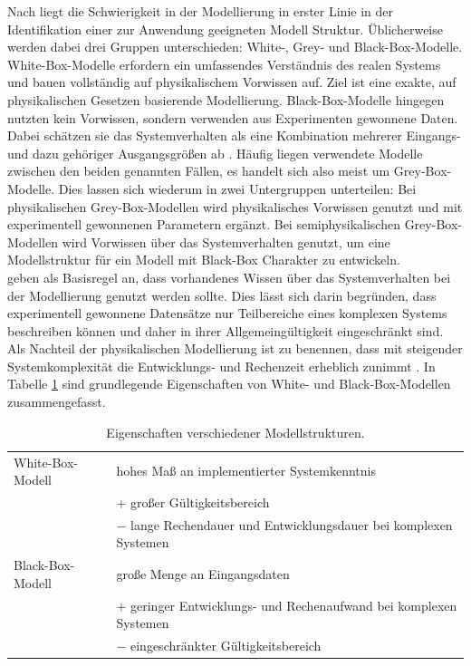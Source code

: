 Nach \citet{sjoberg_nonlinear_1995} liegt die Schwierigkeit in der Modellierung in erster Linie in der Identifikation einer zur Anwendung geeigneten Modell Struktur. Üblicherweise werden dabei drei Gruppen unterschieden: White-, Grey- und Black-Box-Modelle. White-Box-Modelle erfordern ein umfassendes Verständnis des realen Systems und bauen vollständig auf physikalischem Vorwissen auf. Ziel ist eine exakte, auf physikalischen Gesetzen basierende Modellierung. Black-Box-Modelle hingegen nutzten kein Vorwissen, sondern verwenden aus Experimenten gewonnene Daten. Dabei schätzen sie das Systemverhalten als eine Kombination mehrerer Eingangs- und dazu gehöriger Ausgangsgrößen ab \citep{hauth_grey-box_2008}. Häufig liegen verwendete Modelle zwischen den beiden genannten Fällen, es handelt sich also meist um Grey-Box-Modelle. Dies lassen sich wiederum in zwei Untergruppen unterteilen: Bei physikalischen Grey-Box-Modellen wird physikalisches Vorwissen genutzt und mit experimentell gewonnenen Parametern ergänzt. Bei semiphysikalischen Grey-Box-Modellen wird Vorwissen über das Systemverhalten genutzt, um eine Modellstruktur für ein Modell mit Black-Box Charakter zu entwickeln.\\
\citet{sjoberg_nonlinear_1995} geben als Basisregel an, dass vorhandenes Wissen über das Systemverhalten bei der Modellierung genutzt werden sollte. Dies lässt sich darin begründen, dass experimentell gewonnene Datensätze nur Teilbereiche eines komplexen Systems beschreiben können und daher in ihrer Allgemeingültigkeit eingeschränkt sind. Als Nachteil der physikalischen Modellierung ist zu benennen, dass mit steigender Systemkomplexität die Entwicklungs- und Rechenzeit erheblich zunimmt \citep{hauth_grey-box_2008}. In Tabelle \ref{tb:Modellstrukturen} sind grundlegende Eigenschaften von White- und Black-Box-Modellen zusammengefasst. \\

\begin{table}[ht]
		\centering
		\caption{Eigenschaften verschiedener Modellstrukturen.}
		
\begin{tabular}{l l}
		\toprule
		White-Box-Modell & hohes Maß an implementierter Systemkenntnis\\
		& $+$ großer Gültigkeitsbereich\\
		& $-$ lange Rechendauer und Entwicklungsdauer bei komplexen Systemen\\
		\midrule
		Black-Box-Modell & große Menge an Eingangsdaten\\
		& $+$ geringer Entwicklungs- und Rechenaufwand bei komplexen Systemen\\
		& $-$ eingeschränkter Gültigkeitsbereich\\
		\bottomrule
		\end{tabular}
		\label{tb:Modellstrukturen}
		\end{table}	

